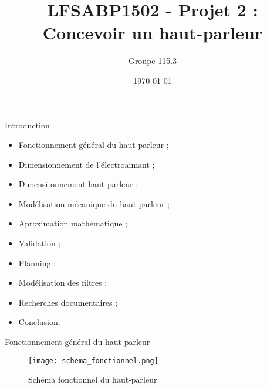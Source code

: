 \documentclass[pdf]{beamer}
\title{LFSABP1502 - Projet 2 : Concevoir un haut-parleur}
\author{Groupe 115.3}
\date{\today}
\begin{document}
\begin{frame}
\titlepage
\end{frame}

\begin{frame}{Introduction}
	\begin{itemize}
		\item Fonctionnement général du haut parleur ;
		\item Dimensionnement de l'électroaimant ;
 		\item Dimensi	onnement haut-parleur ;
 		\item Modélisation mécanique du haut-parleur ;
 		\item Aproximation mathématique ;
 		\item Validation ;
 		\item Planning ;
 		\item Modélisation des filtres ;
 		\item Recherches documentaires ;
 		\item Conclusion.
	\end{itemize}
\end{frame}

\begin{frame}{Fonctionnement général du haut-parleur}
\begin{figure}[ht!]
    \centering
    \texttt{[image: schema\_fonctionnel.png]}
    \caption{Schéma fonctionnel du haut-parleur}
    \label{schema_fonctionnel}
\end{figure}
\end{frame}
\end{document}
